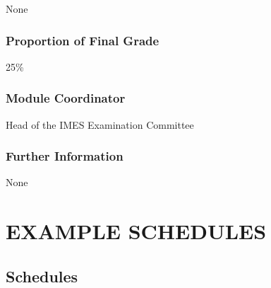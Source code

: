 \documentclass[
  letterpaper,
  10pt,
  openany]{book}
\begin{document}

None

\section*{Proportion of Final Grade}\label{proportion-of-final-grade-5}


25\%

\section*{Module Coordinator}\label{module-coordinator-5}


Head of the IMES Examination Committee

\section*{Further Information}\label{further-information-5}


None

\part{EXAMPLE SCHEDULES}

\chapter*{Schedules}\label{schedules}



\backmatter
\end{document}
